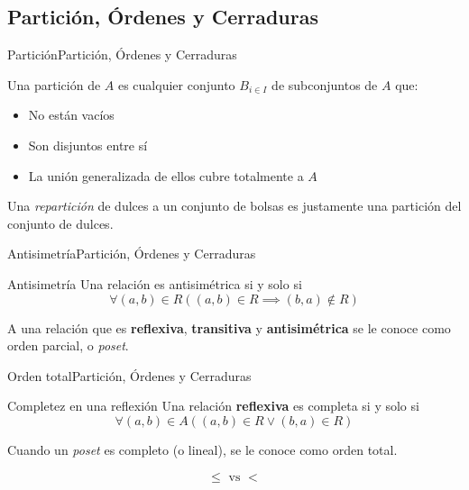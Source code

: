 \documentclass[spanish, c]{beamer}
\begin{document}
\subsection{Partición, Órdenes y Cerraduras}

\begin{frame}{Partición}{Partición, Órdenes y Cerraduras}
    
    Una \alert{partición} de $A$ es cualquier conjunto $B_{i \in I}$ de subconjuntos de $A$ que:

    \begin{itemize}
        \item No están vacíos
        \item Son disjuntos entre sí
        \item La unión generalizada de ellos cubre totalmente a $A$
    \end{itemize} \pause

    \bigskip

    Una \textit{repartición} de dulces a un conjunto de bolsas es justamente una partición del conjunto de dulces.

\end{frame}

\begin{frame}{Antisimetría}{Partición, Órdenes y Cerraduras}

    \begin{block}{Antisimetría}
        Una relación es \alert{antisimétrica} si y solo si
        $$\forall (a,b) \in R\left( (a, b) \in R \implies (b, a) \not \in R \right)$$
    \end{block} \pause

    \bigskip

    A una relación que es \textbf{reflexiva}, \textbf{transitiva} y \textbf{antisimétrica} se le conoce como \alert{orden parcial}, o \textit{poset}.

\end{frame}

\begin{frame}{Orden total}{Partición, Órdenes y Cerraduras}

    \begin{block}{Completez en una reflexión}
        Una relación \textbf{reflexiva} es \alert{completa} si y solo si
        $$\forall (a, b) \in A \left((a,b) \in R \vee (b, a) \in R \right)$$
    \end{block} \pause

    Cuando un \textit{poset} es completo (o lineal), se le conoce como \alert{orden total}. \pause

    \bigskip

    \begin{center}
        \Huge $$\leq \text{ vs } < $$
    \end{center}
\end{frame}
\end{document}
